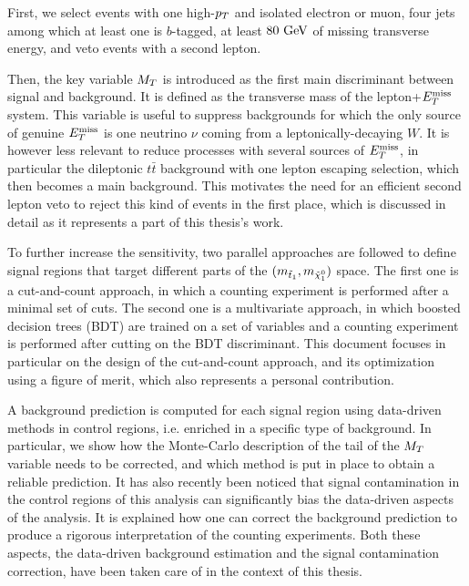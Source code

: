     First, we select events with one high-$p_T$ and isolated electron or muon,
    four jets among which at least one is $b$-tagged, at least $80~\text{GeV}$ of
    missing transverse energy, and veto events with a second lepton.

    Then, the key variable $M_T$ is introduced as the first main discriminant
    between signal and background. It is defined as the transverse mass of the
    lepton+$E_T^\text{miss}$ system. This variable is useful to suppress backgrounds for
    which the only source of genuine $E_T^\text{miss}$ is one neutrino $\nu$ coming from a
    leptonically-decaying $W$. It is however less relevant to reduce processes
    with several sources of $E_T^\text{miss}$, in particular the dileptonic $t\bar{t}$
    background with one lepton escaping selection, which then becomes a main
    background. This motivates the need for an efficient second lepton veto to
    reject this kind of events in the first place, which is discussed in detail
    as it represents a part of this thesis's work.

    To further increase the sensitivity, two parallel approaches are followed to
    define signal regions that target different parts of the
    $(m_{\tilde{t}_1},m_{\tilde{\chi}_1^0})$ space. The first one is a
    cut-and-count approach, in which a counting experiment is performed after a
    minimal set of cuts. The second one is a multivariate approach, in which
    boosted decision trees (BDT) are trained on a set of variables and a
    counting experiment is performed after cutting on the BDT discriminant. This
    document focuses in particular on the design of the cut-and-count approach,
    and its optimization using a figure of merit, which also represents a
    personal contribution.

    A background prediction is computed for each signal region using data-driven
    methods in control regions, i.e. enriched in a specific type of background.
    In particular, we show how the Monte-Carlo description of the tail of the
    $M_T$ variable needs to be corrected, and which method is put in place to
    obtain a reliable prediction.  It has also recently been noticed that signal
    contamination in the control regions of this analysis can significantly bias
    the data-driven aspects of the analysis. It is explained how one can correct
    the background prediction to produce a rigorous interpretation of the
    counting experiments. Both these aspects, the data-driven background
    estimation and the signal contamination correction, have been taken care of
    in the context of this thesis.

